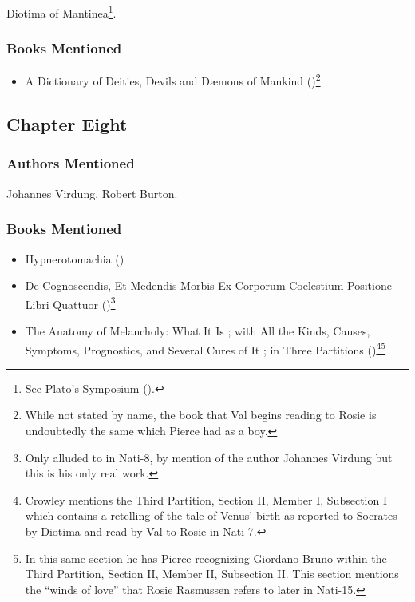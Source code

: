 \documentclass[
]{article}
\providecommand{\tightlist}{%
  \setlength{\itemsep}{0pt}\setlength{\parskip}{0pt}}
\begin{document}
Diotima of Mantinea\footnote{See Plato's Symposium
  ().}.

\subsubsection{Books Mentioned}\label{books-mentioned-12}

\begin{itemize}
\tightlist
\item
  A Dictionary of Deities, Devils and Dæmons of Mankind
  ()\footnote{While not stated
    by name, the book that Val begins reading to Rosie is undoubtedly
    the same which Pierce had as a boy.}
\end{itemize}

\subsection{Chapter Eight}\label{chapter-eight}

\subsubsection{Authors Mentioned}\label{authors-mentioned-12}

Johannes Virdung, Robert Burton.

\subsubsection{Books Mentioned}\label{books-mentioned-13}

\begin{itemize}
\tightlist
\item
  Hypnerotomachia ()
\item
  De Cognoscendis, Et Medendis Morbis Ex Corporum Coelestium Positione
  Libri Quattuor ()\footnote{Only
    alluded to in Nati-8, by mention of the author Johannes Virdung but
    this is his only real work.}
\item
  The Anatomy of Melancholy: What It Is ; with All the Kinds, Causes,
  Symptoms, Prognostics, and Several Cures of It ; in Three Partitions
  ()\footnote{Crowley mentions the
    Third Partition, Section II, Member I, Subsection I which contains a
    retelling of the tale of Venus' birth as reported to Socrates by
    Diotima and read by Val to Rosie in Nati-7.}\footnote{In this same
    section he has Pierce recognizing Giordano Bruno within the Third
    Partition, Section II, Member II, Subsection II. This section
    mentions the ``winds of love'' that Rosie Rasmussen refers to later
    in Nati-15.}
\end{itemize}
\end{document}
